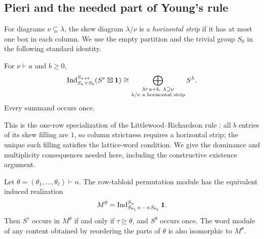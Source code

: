 \subsection{Pieri and the needed part of Young's rule}

For diagrams $\nu\subseteq\lambda$, the skew diagram $\lambda/\nu$
is a \emph{horizontal strip} if it has at most one box in each column.
We use the empty partition and the trivial group $S_0$ in the following
standard identity.

\begin{lemma}\label{lem:pieri}
For $\nu\vdash a$ and $b\ge0$,
\begin{equation}\label{tools:pieri}
 \operatorname{Ind}_{S_a\times S_b}^{S_{a+b}}
      (S^\nu\boxtimes\mathbf1)
 \cong
 \bigoplus_{\substack{\lambda\vdash a+b,\ \lambda\supseteq\nu\\
                      \lambda/\nu\text{ a horizontal strip}}}
       S^\lambda.
\end{equation}
Every summand occurs once.
\end{lemma}

This is the one-row specialization of the Littlewood--Richardson rule
\cite[Section~16, especially Rule~16.4]{james1978}: all $b$ entries of
its skew filling are $1$, so column strictness requires a horizontal
strip; the unique such filling satisfies the lattice-word condition.
We give the dominance and multiplicity
consequences needed here, including the constructive existence argument.

\begin{lemma}
\label{lem:young-rule}
Let $\theta=(\theta_1,\ldots,\theta_\ell)\vdash n$. The row-tabloid
permutation module has the equivalent induced realization
\[
 M^\theta=
 \operatorname{Ind}_{S_{\theta_1}\times\cdots\times S_{\theta_\ell}}^{S_n}
 \mathbf1.
\]
Then $S^\tau$ occurs in $M^\theta$ if and only if
$\tau\unrhd\theta$, and $S^\theta$ occurs once.
The word module of any content obtained by reordering the parts of
$\theta$ is also isomorphic to $M^\theta$.
\end{lemma}

